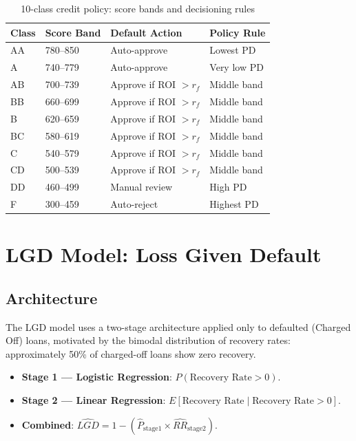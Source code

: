 \documentclass[12pt,a4paper]{report}
\begin{document}
\begin{table}[H]
\centering
\caption{10-class credit policy: score bands and decisioning rules}
\label{tab:policy}
\begin{tabular}{llll}
\toprule
\textbf{Class} & \textbf{Score Band} & \textbf{Default Action} & \textbf{Policy Rule} \\
\midrule
AA & 780--850 & Auto-approve & Lowest PD \\
A  & 740--779 & Auto-approve & Very low PD \\
AB & 700--739 & Approve if ROI $> r_f$ & Middle band \\
BB & 660--699 & Approve if ROI $> r_f$ & Middle band \\
B  & 620--659 & Approve if ROI $> r_f$ & Middle band \\
BC & 580--619 & Approve if ROI $> r_f$ & Middle band \\
C  & 540--579 & Approve if ROI $> r_f$ & Middle band \\
CD & 500--539 & Approve if ROI $> r_f$ & Middle band \\
DD & 460--499 & Manual review           & High PD \\
F  & 300--459 & Auto-reject             & Highest PD \\
\bottomrule
\end{tabular}
\end{table}

\section{LGD Model: Loss Given Default}

\subsection{Architecture}

The LGD model uses a two-stage architecture applied only to defaulted (Charged Off) loans, motivated by the bimodal distribution of recovery rates: approximately 50\% of charged-off loans show zero recovery.

\begin{itemize}
  \item \textbf{Stage 1 --- Logistic Regression}: $P(\text{Recovery Rate} > 0)$.
  \item \textbf{Stage 2 --- Linear Regression}: $E[\text{Recovery Rate} \mid \text{Recovery Rate} > 0]$.
  \item \textbf{Combined}: $\hat{LGD} = 1 - (\hat{P}_{\text{stage1}} \times \hat{RR}_{\text{stage2}})$.
\end{itemize}
\end{document}
